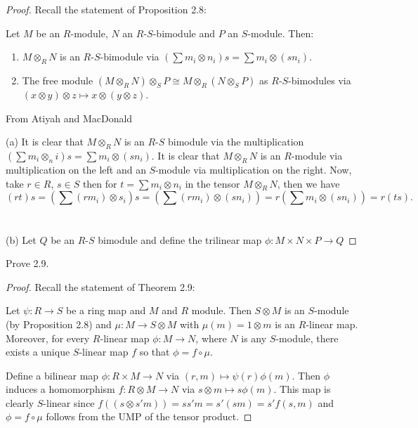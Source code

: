 \begin{proof}
Recall the statement of Proposition 2.8:
\begin{proposition*}
Let $M$ be an $R$-module, $N$ an $R$-$S$-bimodule and $P$ an
$S$-module. Then:
\begin{enumerate}[noitemsep,label=(\alph*)]
\item $M\otimes_R N$ is an $R$-$S$-bimodule via $\left(\sum
    m_i\otimes n_i\right)s=\sum m_i\otimes (sn_i).$
\item The free module $(M\otimes_R N)\otimes_S P\cong M\otimes_R
  (N\otimes_S P)$ as $R$-$S$-bimodules via $(x\otimes y)\otimes
  z\mapsto x\otimes (y\otimes z)$.
\end{enumerate}
\end{proposition*}
From Atiyah and MacDonald
\vspace{.25in}

\noindent (a) It is clear that $M\otimes_R N$ is an $R$-$S$
bimodule via the multiplication $\left(\sum m_i\otimes
  _ni\right)s=\sum m_i\otimes\left(sn_i\right)$. It is clear that
$M\otimes_R N$ is an $R$-module via multiplication on the left
and an $S$-module via multiplication on the right. Now, take
$r\in R$, $s\in S$ then for $t=\sum m_i\otimes n_i$ in the tensor
$M\otimes_R N$, then we have
\[
(rt)s=\left(\sum\left(r m_i\right)\otimes
  s_i\right)s=\left(\sum\left(r m_i\right)\otimes\left(s
    n_i\right)\right)
=r\left(\sum m_i\otimes\left(s n_i\right)\right)=r(ts).
\]
\\\\
(b) Let $Q$ be an $R$-$S$ bimodule and define the trilinear map
$\phi\colon M\times N\times P\to Q$
\end{proof}
\newpage
\begin{problem}
Prove 2.9.
\end{problem}
\begin{proof}
Recall the statement of Theorem 2.9:
\begin{theorem*}
Let $\psi\colon R\to S$ be a ring map and $M$ and $R$
module. Then $S\otimes M$ is an $S$-module (by Proposition
2.8) and $\mu\colon M\to S\otimes M$ with $\mu(m)=1\otimes m$
is an $R$-linear map. Moreover, for every $R$-linear map
$\phi\colon M\to N$, where $N$ is any $S$-module, there exists a
unique $S$-linear map $f$ so that $\phi=f\circ\mu$.
\end{theorem*}
\noindent
Define a bilinear map $\phi\colon R\times M\to N$ via
$(r,m)\mapsto\psi(r)\phi(m)$. Then $\phi$ induces a homomorphism
$f\colon R\otimes M\to N$ via $s\otimes m\mapsto s\phi(m)$. This
map is clearly $S$-linear since $f((s\otimes
s'm))=ss'm=s'(sm)=s'f(s,m)$ and $\phi=f\circ\mu$ follows from the
UMP of the tensor product.
\end{proof}
